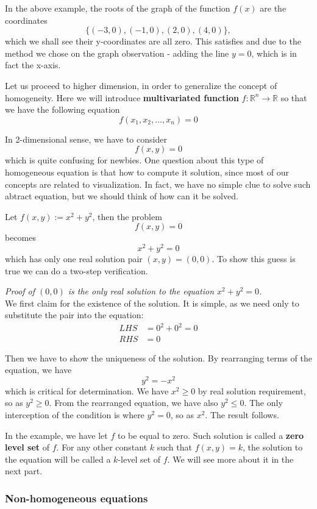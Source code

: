 \documentclass[12pt]{article}
\renewenvironment{proof}[1][Proof]{\begin{snugshade*} \textit{{#1}.}\\}{\hfill \qedsymbol \end{snugshade*}}
\begin{document}
    In the above example, the roots of the graph of the function $f(x)$ are the coordinates $$\{(-3,0), (-1,0), (2,0), (4,0)\},$$ which we shall see their y-coordinates are all zero. This satisfies and due to the method we chose on the graph observation - adding the line $y=0$, which is in fact the x-axis.

    Let us proceed to higher dimension, in order to generalize the concept of homogeneity. Here we will introduce \textbf{multivariated function} $f:\mathbb{R}^n\to \mathbb{R}$ so that we have the following equation \[f(x_1,x_2,\dots ,x_n)=0\]

    In 2-dimensional sense, we have to consider \[f(x,y)=0\] which is quite confusing for newbies. One question about this type of homogeneous equation is that how to compute it solution, since most of our concepts are related to visualization. In fact, we have no simple clue to solve such abtract equation, but we should think of how can it be solved.

    Let $f(x,y):=x^2+y^2$, then the problem \[f(x,y)=0\] becomes \[x^2+y^2=0\] which has only one real solution pair $(x,y)=(0,0)$. To show this guess is true we can do a two-step verification.

    \begin{proof}[Proof of $(0,0)$ is the only real solution to the equation $x^2+y^2=0$]
        We first claim for the existence of the solution. It is simple, as we need only to substitute the pair into the equation:\begin{align*}
            LHS &= 0^2+0^2=0\\
            RHS &= 0
        \end{align*}

        Then we have to show the uniqueness of the solution. By rearranging terms of the equation, we have \[y^2=-x^2\] which is critical for determination. We have $x^2\geq 0$ by real solution requirement, so as $y^2\geq 0$. From the rearranged equation, we have also $y^2\leq 0$. The only interception of the condition is where $y^2=0$, so as $x^2$. The result follows.
    \end{proof}

    In the example, we have let $f$ to be equal to zero. Such solution is called a \textbf{zero level set} of $f$. For any other constant $k$ such that $f(x,y)=k$, the solution to the equation will be called a $k$-level set of $f$. We will see more about it in the next part.

    \subsubsection*{Non-homogeneous equations}
\end{document}
